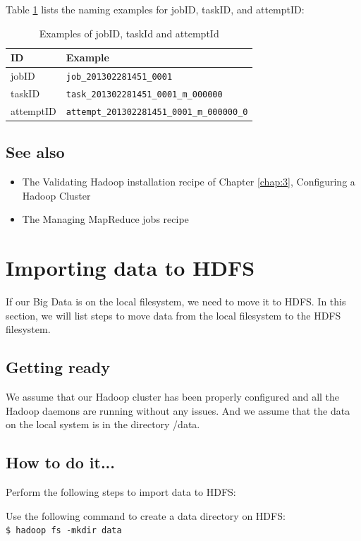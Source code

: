 Table \ref{tbl:ids} lists the naming examples for jobID, taskID, and attemptID:
\begin{table}
  \centering
  \begin{tabular}{ll}
    \toprule 
    \textbf{ID} & \textbf{Example} \\ \midrule
    jobID & \verb|job_201302281451_0001| \\ 
    taskID & \verb|task_201302281451_0001_m_000000| \\
    attemptID & \verb|attempt_201302281451_0001_m_000000_0| \\ \bottomrule
  \end{tabular}
  \caption{Examples of jobID, taskId and attemptId}\label{tbl:ids}
\end{table}

\subsection*{See also}
\begin{itemize}
  \item The Validating Hadoop installation recipe of Chapter \ref{chap:3}, Configuring a Hadoop Cluster
  \item The Managing MapReduce jobs recipe
\end{itemize}
\section{Importing data to HDFS}
If our Big Data is on the local filesystem, we need to move it to HDFS. In this section, we will list steps to move data from the local filesystem to the HDFS filesystem.

\subsection*{Getting ready}
We assume that our Hadoop cluster has been properly configured and all the Hadoop daemons are running without any issues. And we assume that the data on the local system is in the directory /data.
\subsection*{How to do it...}
Perform the following steps to import data to HDFS: 

Use the following command to create a data directory on HDFS: \\
\verb|$ hadoop fs -mkdir data|

